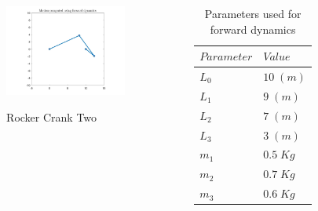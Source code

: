 \documentclass[10pt,aspectratio=169]{beamer}
\begin{document}
\begin{frame}
\begin{columns}
\begin{column}{4cm}
	\end{column}
	\begin{column}{4cm}
		\begin{figure}
		\centering
		\href{run:./figure/rockerCrank2Forward.avi}{\includegraphics[width=4cm,keepaspectratio]{rockerCrank2banner}}
		\caption{\scriptsize{Rocker Crank Two}}
	\end{figure}
	\end{column}
	\begin{column}{4cm}
		\begin{table}
			\caption{\scriptsize{Parameters used for forward dynamics}}
			{\scriptsize 
				\begin{tabular}{ll}
				\hline
				$Parameter$ & $Value$ \\
				\hline
				$L_0$ & $10\; (m)$\\
				$L_1$ & $9 \; (m)$\\	
				$L_2$ & $7 \; (m)$\\
				$L_3$ & $3 \; (m)$\\
				$m_1$ & $0.5\; Kg$ \\	
				$m_2$ & $0.7\; Kg$\\
				$m_3$ & $0.6\; Kg$\\
				\hline
			\end{tabular}
		}
		\end{table}
	\end{column}
\end{columns}
\end{frame}
\end{document}
